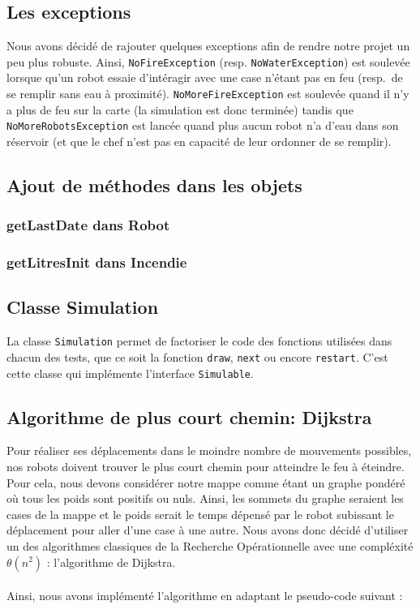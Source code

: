 \documentclass[a4paper,8pt]{article} %
\begin{document}
\subsection{Les exceptions}

Nous avons décidé de rajouter quelques exceptions afin de rendre notre projet un peu plus robuste. 
Ainsi, {\tt NoFireException} (resp. {\tt NoWaterException}) est soulevée lorsque qu'un robot essaie d'intéragir avec une case n'étant pas en feu (resp.\ de se remplir sans eau à proximité).
{\tt NoMoreFireException} est soulevée quand il n'y a plus de feu sur la carte (la simulation est donc terminée) tandis que {\tt NoMoreRobotsException} est lancée quand plus aucun robot n'a d'eau dans son réservoir (et que le chef n'est pas en capacité de leur ordonner de se remplir).

\subsection{Ajout de méthodes dans les objets}
\subsubsection{getLastDate dans Robot}
\subsubsection{getLitresInit dans Incendie}
\subsection{Classe Simulation}

La classe {\tt Simulation} permet de factoriser le code des fonctions utilisées dans chacun des tests, que ce soit la fonction {\tt draw}, {\tt next} ou encore {\tt restart}.
C'est cette classe qui implémente l'interface {\tt Simulable}.

\subsection{Algorithme de plus court chemin: Dijkstra}

Pour réaliser ses déplacements dans le moindre nombre de mouvements possibles, nos robots doivent trouver le plus court chemin pour atteindre le feu à éteindre. Pour cela, nous devons considérer notre mappe comme étant un graphe pondéré où tous les poids sont positifs ou nuls. Ainsi, les sommets du graphe seraient les cases de la mappe et le poids serait le temps dépensé par le robot subissant le déplacement pour aller d'une case à une autre. Nous avons donc décidé d'utiliser un des algorithmes classiques de la Recherche Opérationnelle avec une compléxité $\theta(n^2)$ : l'algorithme de Dijkstra. \\ \\
Ainsi, nous avons implémenté l'algorithme en adaptant le pseudo-code suivant : \\ \\
\end{document}
